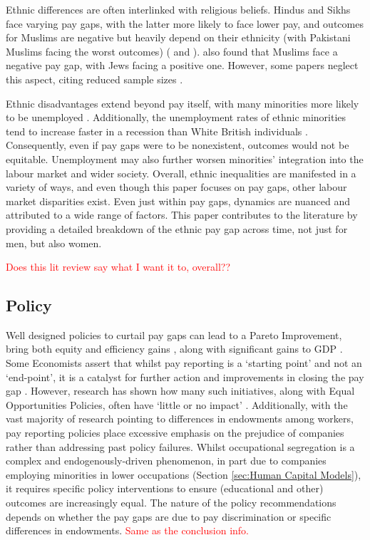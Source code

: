 \documentclass[class=article, crop=false]{standalone}
\begin{document}
Ethnic differences are often interlinked with religious beliefs. Hindus and Sikhs face varying pay gaps, with the latter more likely to face lower pay, and outcomes for Muslims are negative but heavily depend on their ethnicity (with Pakistani Muslims facing the worst outcomes) (\citet{Johnston} and \citet{Longhi}). \citep{Metcalf} also found that Muslims face a negative pay gap, with Jews facing a positive one. However, some papers neglect this aspect, citing reduced sample sizes \citep{Brynin}.

Ethnic disadvantages extend beyond pay itself, with many minorities more likely to be unemployed \citep{Heath}. Additionally, the unemployment rates of ethnic minorities tend to increase faster in a recession than White British individuals \citep{Jones}. Consequently, even if pay gaps were to be nonexistent, outcomes would not be equitable. Unemployment may also further worsen minorities' integration into the labour market and wider society. Overall, ethnic inequalities are manifested in a variety of ways, and even though this paper focuses on pay gaps, other labour market disparities exist. Even just within pay gaps, dynamics are nuanced and attributed to a wide range of factors. This paper contributes to the literature by providing a detailed breakdown of the ethnic pay gap across time, not just for men, but also women.

\textcolor{red}{Does this lit review say what I want it to, overall??}

\subsection{Policy}
\label{sec:Policy} %
Well designed policies to curtail pay gaps can lead to a Pareto Improvement, bring both equity and efficiency gains \citep{LundbergB}, along with significant gains to GDP \citep{GOVg}. Some Economists assert that whilst pay reporting is a \enquote*{starting point} and not an \enquote*{end-point}, it is a catalyst for further action and improvements in closing the pay gap \citep{BoE}. However, research has shown how many such initiatives, along with Equal Opportunities Policies, often have \enquote*{little or no impact} \cite[p.~113]{Noon}. Additionally, with the vast majority of research pointing to differences in endowments among workers, pay reporting policies place excessive emphasis on the prejudice of companies rather than addressing past policy failures. Whilst occupational segregation is a complex and endogenously-driven phenomenon, in part due to companies employing minorities in lower occupations (Section \ref{sec:Human Capital Models}), it requires specific policy interventions to ensure (educational and other) outcomes are increasingly equal. The nature of the policy recommendations depends on whether the pay gaps are due to pay discrimination or specific differences in endowments. \textcolor{red}{Same as the conclusion info.}

\ifstandalone

\fi
\end{document}
